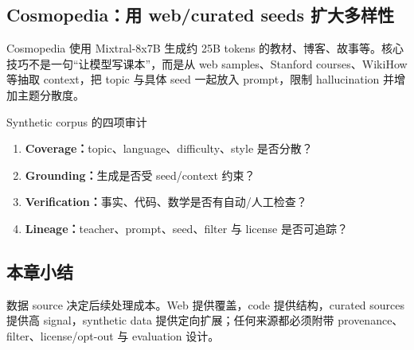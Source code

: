 \subsection{Cosmopedia：用 web/curated seeds 扩大多样性}

Cosmopedia 使用 Mixtral-8x7B 生成约 25B tokens 的教材、博客、故事等。核心技巧不是一句“让模型写课本”，而是从 web samples、Stanford courses、WikiHow 等抽取 context，把 topic 与具体 seed 一起放入 prompt，限制 hallucination 并增加主题分散度。



\begin{knowledgebox}{Synthetic corpus 的四项审计}
\begin{enumerate}
  \item \textbf{Coverage：}topic、language、difficulty、style 是否分散？
  \item \textbf{Grounding：}生成是否受 seed/context 约束？
  \item \textbf{Verification：}事实、代码、数学是否有自动/人工检查？
  \item \textbf{Lineage：}teacher、prompt、seed、filter 与 license 是否可追踪？
\end{enumerate}
\end{knowledgebox}


\subsection{本章小结}

数据 source 决定后续处理成本。Web 提供覆盖，code 提供结构，curated sources 提供高 signal，synthetic data 提供定向扩展；任何来源都必须附带 provenance、filter、license/opt-out 与 evaluation 设计。


